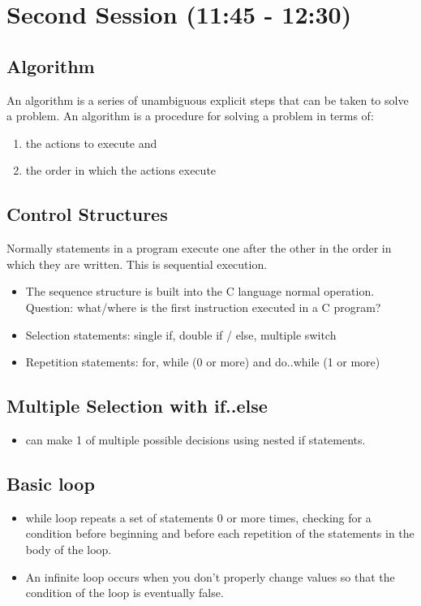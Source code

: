 \documentclass[11pt]{article}
\begin{document}
\section{Second Session (11:45 - 12:30)}
\label{sec-2}
\subsection{Algorithm}
\label{sec-2-1}
An algorithm is a series of unambiguous explicit steps that can be taken to solve a problem.
An algorithm is a procedure for solving a problem in terms of:

\begin{enumerate}
\item the actions to execute and
\item the order in which the actions execute
\end{enumerate}

\subsection{Control Structures}
\label{sec-2-2}
Normally statements in a program execute one after the other in the
order in which they are written.  This is sequential execution.

\begin{itemize}
\item The sequence structure is built into the C language normal operation.
Question: what/where is the first instruction executed in a C program?
\item Selection statements: single if, double if / else, multiple switch
\item Repetition statements: for, while (0 or more) and do..while (1 or more)
\end{itemize}
\subsection{Multiple Selection with if..else}
\label{sec-2-3}
\begin{itemize}
\item can make 1 of multiple possible decisions using nested if statements.
\end{itemize}
\subsection{Basic loop}
\label{sec-2-4}
\begin{itemize}
\item while loop repeats a set of statements 0 or more times, checking for
a condition before beginning and before each repetition of the
statements in the body of the loop.
\item An infinite loop occurs when you don't properly change values so
that the condition of the loop is eventually false.
\end{itemize}
\end{document}
